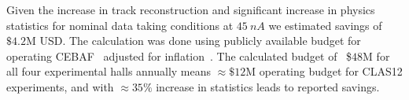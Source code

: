 Given the increase in track reconstruction and significant increase in physics statistics for nominal data taking conditions at $45~nA$ we estimated savings of  $\$4.2$M USD. The calculation was done using publicly available budget for operating CEBAF~\cite{CEBAF:oper} adjusted for inflation~\cite{GoogleDotCom}. The calculated budget of ~\$$48$M for all four experimental halls annually means $\approx \$12$M operating budget for CLAS12 experiments, and with $\approx 35\%$ increase in statistics leads to reported savings.


